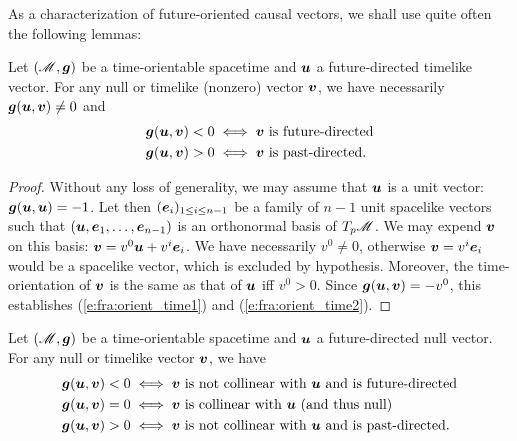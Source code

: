 As a characterization of future-oriented causal vectors,
we shall use quite often the following lemmas:

\begin{lemma}
\label{p:fra:lem1}
Let $(\mathscr{M},\bm{g})$ be a time-orientable spacetime and $\bm{u}$ a future-directed
timelike vector. For any null or timelike (nonzero) vector $\bm{v}$, we have necessarily
$\bm{g}(\bm{u},\bm{v}) \neq 0$ and
\begin{subequations}
\begin{align}
& \bm{g}(\bm{u},\bm{v}) < 0 \iff \bm{v} \ \mbox{is future-directed} \label{e:fra:orient_time1} \\
& \bm{g}(\bm{u},\bm{v}) > 0 \iff \bm{v} \ \mbox{is past-directed} . \label{e:fra:orient_time2}
\end{align}
\end{subequations}
\end{lemma}
\begin{proof}
Without any loss of generality, we may assume that $\bm{u}$ is a unit vector: $\bm{g}(\bm{u},\bm{u}) = -1$.
Let then $(\bm{e}_i)_{1\leq i \leq n-1}$ be a family of $n-1$ unit spacelike vectors such
that $(\bm{u},\bm{e}_1,\ldots,\bm{e}_{n-1})$ is an orthonormal basis of $T_p\mathscr{M}$.
We may expend $\bm{v}$ on this basis: $\bm{v} = v^0 \bm{u} + v^i \bm{e}_i$.
We have
necessarily $v^0 \not = 0$, otherwise $\bm{v} = v^i \bm{e}_i$ would be a spacelike
vector, which is excluded by hypothesis.
Moreover, the time-orientation of $\bm{v}$ is the same as that of $\bm{u}$
iff $v^0>0$. Since $\bm{g}(\bm{u},\bm{v}) = - v^0$, this
establishes (\ref{e:fra:orient_time1}) and (\ref{e:fra:orient_time2}).
\end{proof}

\begin{lemma}
\label{p:fra:lem2}
Let $(\mathscr{M},\bm{g})$ be a time-orientable spacetime and $\bm{u}$ a future-directed
null vector. For any null or timelike vector $\bm{v}$, we have
\begin{subequations}
\begin{align}
& \bm{g}(\bm{u},\bm{v}) < 0 \iff \bm{v} \ \mbox{is not collinear with $\bm{u}$ and is future-directed} \label{e:fra:orient_null1} \\
& \bm{g}(\bm{u},\bm{v}) = 0 \iff \mbox{$\bm{v}$ is collinear with $\bm{u}$ (and thus null)} \label{e:fra:orient_null2} \\
& \bm{g}(\bm{u},\bm{v}) > 0 \iff \bm{v} \ \mbox{is not collinear with $\bm{u}$ and is past-directed} . \label{e:fra:orient_null3}
\end{align}
\end{subequations}
\end{lemma}

